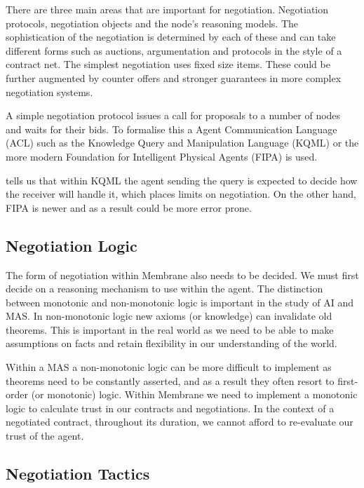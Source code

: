 \documentclass[11pt, a4paper, twocolumn, twoside]{report}
\begin{document}
There are three main areas that are important for negotiation. Negotiation protocols, negotiation objects and the node's reasoning models. \citep{beer1999negotiation} The sophistication of the negotiation is determined by each of these and can take different forms such as auctions, argumentation and protocols in the style of a contract net. The simplest negotiation uses fixed size items. These could be further augmented by counter offers and stronger guarantees in more complex negotiation systems.

A simple negotiation protocol issues a call for proposals to a number of nodes and waits for their bids. To formalise this a Agent Communication Language (ACL) such as the Knowledge Query and Manipulation Language (KQML) \citep{finin1992specification} or the more modern Foundation for Intelligent Physical Agents (FIPA) \citep{fipa2002fipa} is used.

\citep{rahwan2005interest} \cite{beer1999negotiation} tells us that within KQML the agent sending the query is expected to decide how the receiver will handle it, which places limits on negotiation. On the other hand, FIPA is newer and as a result could be more error prone.

\subsection{Negotiation Logic}

The form of negotiation within Membrane also needs to be decided. We must first decide on a reasoning mechanism to use within the agent. The distinction between monotonic and non-monotonic logic is important in the study of AI and MAS. In non-monotonic logic new axioms (or knowledge) can invalidate old theorems. \citep*{mcdermott1980non, antonelli2008non} This is important in the real world as we need to be able to make assumptions on facts and retain flexibility in our understanding of the world.

Within a MAS a non-monotonic logic can be more difficult to implement as theorems need to be constantly asserted, and as a result they often resort to first-order (or monotonic) logic. Within Membrane we need to implement a monotonic logic to calculate trust in our contracts and negotiations. In the context of a negotiated contract, throughout its duration, we cannot afford to re-evaluate our trust of the agent.

\subsection{Negotiation Tactics}
\end{document}
